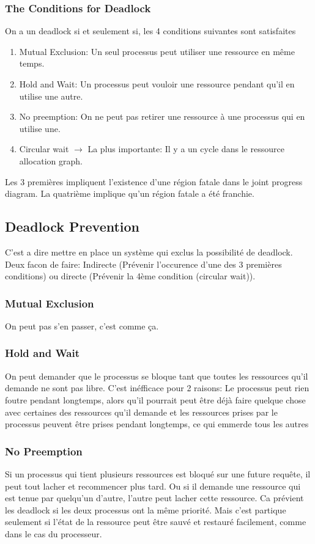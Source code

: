 \subsubsection{The Conditions for Deadlock}
On a un deadlock si et seulement si, les 4 conditions suivantes sont satisfaites
\begin{enumerate}
  \item Mutual Exclusion: Un seul processus peut utiliser une ressource en même temps.
  \item Hold and Wait: Un processus peut vouloir une ressource pendant qu'il en utilise une autre.
  \item No preemption: On ne peut pas retirer une ressource à une processus qui en utilise une.
  \item Circular wait $\to$ La plus importante: Il y a un cycle dans le ressource allocation graph.
\end{enumerate}
Les 3 premières impliquent l'existence d'une région fatale dans le joint progress diagram.
La quatrième implique qu'un région fatale a été franchie.

\subsection{Deadlock Prevention}
C'est a dire mettre en place un système qui exclus la possibilité de deadlock.
Deux facon de faire:
Indirecte (Prévenir l'occurence d'une des 3 premières conditions)
ou directe (Prévenir la 4ème condition (circular wait)).

\subsubsection{Mutual Exclusion}
On peut pas s'en passer, c'est comme ça.

\subsubsection{Hold and Wait}
On peut demander que le processus se bloque tant que toutes les ressources qu'il demande ne sont pas libre.
C'est inéfficace pour 2 raisons:
Le processus peut rien foutre pendant longtemps,
alors qu'il pourrait peut être déjà faire quelque chose avec certaines des ressources qu'il demande et les ressources prises
par le processus peuvent être prises pendant longtemps, ce qui emmerde tous les autres

\subsubsection{No Preemption}
Si un processus qui tient plusieurs ressources est bloqué sur une future requête,
il peut tout lacher et recommencer plus tard.
Ou si il demande une ressource qui est tenue par quelqu'un d'autre,
l'autre peut lacher cette ressource.
Ca prévient les deadlock si les deux processus ont la même priorité.
Mais c'est partique seulement si l'état de la ressource peut être sauvé et restauré facilement,
comme dans le cas du processeur.

